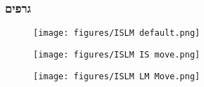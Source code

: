 \documentclass[usenames,dvipsnames]{beamer}
\begin{document}
\begin{RTL}
        \begin{frame}[allowframebreaks]
            \frametitle{גרפים}
        
            \begin{figure}[H]
                    \begin{center}
                        \texttt{[image: figures/ISLM default.png]}
                    \end{center}
                    \label{fig:}
            \end{figure}
            
            \begin{figure}[H]
                \begin{small}
                    \begin{center}
                        \texttt{[image: figures/ISLM IS move.png]}
                    \end{center}
                    \label{fig:}
                \end{small}
            \end{figure}
            
            \begin{figure}[H]
                \begin{small}
                    \begin{center}
                        \texttt{[image: figures/ISLM LM Move.png]}
                    \end{center}
                    \label{fig:}
                \end{small}
            \end{figure}
        
        \end{frame}
\end{RTL}
\end{document}
